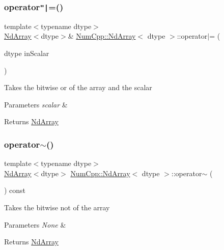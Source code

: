 \subsubsection{\texorpdfstring{operator\texttt{"|}=()}{operator|=()}\hspace{0.1cm}{\footnotesize\ttfamily [2/2]}}
{\footnotesize\ttfamily template$<$typename dtype$>$ \\
\mbox{\hyperlink{class_num_cpp_1_1_nd_array}{Nd\+Array}}$<$dtype$>$\& \mbox{\hyperlink{class_num_cpp_1_1_nd_array}{Num\+Cpp\+::\+Nd\+Array}}$<$ dtype $>$\+::operator$\vert$= (\begin{DoxyParamCaption}\item[{dtype}]{in\+Scalar }\end{DoxyParamCaption})\hspace{0.3cm}{\ttfamily [inline]}}

Takes the bitwise or of the array and the scalar


\begin{DoxyParams}{Parameters}
{\em scalar} & \\
\hline
\end{DoxyParams}
\begin{DoxyReturn}{Returns}
\mbox{\hyperlink{class_num_cpp_1_1_nd_array}{Nd\+Array}} 
\end{DoxyReturn}
\mbox{\label{class_num_cpp_1_1_nd_array_a07f036e8ef7e876aca9689c79938bd6f}} 
\subsubsection{\texorpdfstring{operator$\sim$()}{operator~()}}
{\footnotesize\ttfamily template$<$typename dtype$>$ \\
\mbox{\hyperlink{class_num_cpp_1_1_nd_array}{Nd\+Array}}$<$dtype$>$ \mbox{\hyperlink{class_num_cpp_1_1_nd_array}{Num\+Cpp\+::\+Nd\+Array}}$<$ dtype $>$\+::operator$\sim$ (\begin{DoxyParamCaption}{ }\end{DoxyParamCaption}) const\hspace{0.3cm}{\ttfamily [inline]}}

Takes the bitwise not of the array


\begin{DoxyParams}{Parameters}
{\em None} & \\
\hline
\end{DoxyParams}
\begin{DoxyReturn}{Returns}
\mbox{\hyperlink{class_num_cpp_1_1_nd_array}{Nd\+Array}} 
\end{DoxyReturn}
\mbox{\label{class_num_cpp_1_1_nd_array_a54144687b3985cf5c5d2a9ea6c3676a7}} 
